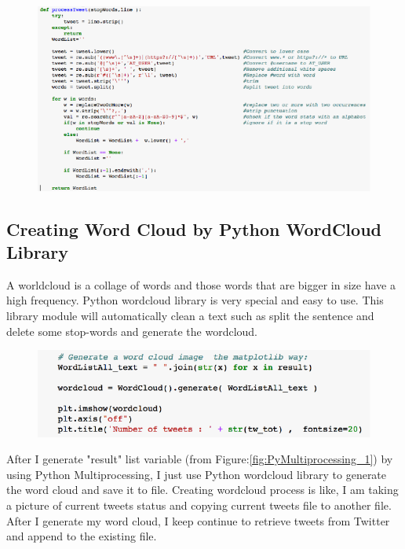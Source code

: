 \documentclass[12pt,notitlepage]{article}
\begin{document}
\begin{figure}[htb]
	\centering
	\includegraphics[width=1.2\linewidth]{PyMultiprocessing_2.pdf}
	\caption{}
	\label{fig:PyMultiprocessing_2}
\end{figure}



\subsection{Creating Word Cloud by Python WordCloud Library} 


A worldcloud is a collage of words and those words that are bigger in size have a high frequency. Python wordcloud library is very special and easy to use. This library module will automatically clean a text such as split the sentence and delete some stop-words and generate the wordcloud.

\begin{figure}[htb]
	\centering
	\includegraphics[width=0.9\linewidth]{PyWordCloud_1.pdf}
	\caption{}
	\label{fig:PyWordCloud_1}
\end{figure}


After I generate "result" list variable (from Figure:\ref{fig:PyMultiprocessing_1})  by using Python Multiprocessing, I just use Python wordcloud library to generate the word cloud and save it to file.  Creating wordcloud process is like, I am taking a picture of current tweets status and copying current tweets file to another file. After I generate my word cloud, I keep continue to retrieve tweets from Twitter and append to the existing file. 
\end{document}
